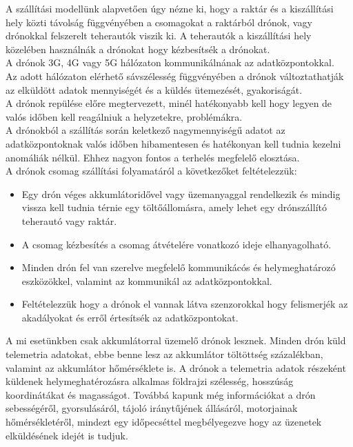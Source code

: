 A szállítási modellünk alapvetően úgy nézne ki, hogy a raktár és a kiszállítási hely közti távolság függvényében a csomagokat a raktárból drónok, vagy drónokkal felszerelt teherautók viszik ki.
A teherautók a kiszállítási hely közelében használnák a drónokat hogy kézbesítsék a drónokat.\\
A drónok 3G, 4G vagy 5G hálózaton kommunikálnának az adatközpontokkal.\\
Az adott hálózaton elérhető sávszélesség függvényében a drónok változtathatják az elküldött adatok mennyiségét és a küldés ütemezését, gyakoriságát.\\
A drónok repülése előre megtervezett, minél hatékonyabb kell hogy legyen de valós időben kell reagálniuk a helyzetekre, problémákra.\\
A drónokból a szállítás során keletkező nagymennyiségű adatot az adatközpontoknak valós időben hibamentesen
és hatékonyan kell tudnia kezelni anomáliák nélkül. Ehhez nagyon fontos a terhelés megfelelő elosztása. \\

A drónok csomag szállítási folyamatáról a következőket feltételezzük:
\begin{itemize}
    \item Egy drón  véges akkumlátoridővel vagy üzemanyaggal rendelkezik és mindig vissza kell tudnia térnie egy töltőállomásra, amely lehet egy drónszállító teherautó vagy raktár.
    \item A csomag kézbesítés a csomag átvételére vonatkozó ideje elhanyagolható.
    \item Minden drón fel van szerelve megfelelő kommunikácós és helymeghatározó eszközökkel, valamint az kommunikál az adatközpontokkal.
    \item Feltételezzük hogy a drónok el vannak látva szenzorokkal hogy felismerjék az akadályokat és erről értesítsék az adatközpontokat.
\end{itemize}
A mi esetünkben csak akkumlátorral üzemelő drónok lesznek. Minden drón küld telemetria adatokat,
ebbe benne lesz az akkumlátor töltöttség százalékban, valamint az akkumlátor hőmérséklete is.
A drónok a telemetria adatok részeként küldenek helymeghatérozásra alkalmas
földrajzi szélesség, hosszúság koordinátákat és magasságot.
Továbbá kapunk még információkat a drón sebességéről,
gyorsulásáról, tájoló iránytűjének állásáról, motorjainak hőmérsékletéről,
mindezt egy időpecséttel megbélyegezve hogy az üzenetek elküldésének idejét is tudjuk.


